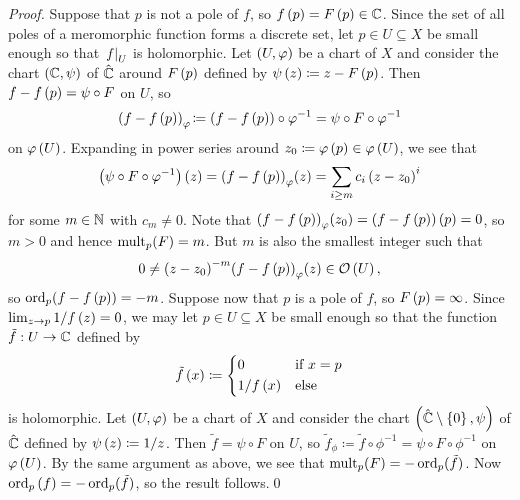 \documentclass[../Moduli_Spaces_of_Riemann_Surfaces.tex]{subfiles}
\begin{document}
    \begin{proof}
        Suppose that $p$ is not a pole of $f$, so $f\left(p\right)=F\left(p\right)\in\mathbb{C}$. Since the set of all poles of a meromorphic function forms a discrete set, let $p\in U\subseteq X$ be small enough so that $\left.f\right|_U$ is holomorphic. Let $\left(U,\varphi\right)$ be a chart of $X$ and consider the chart $\left(\mathbb{C},\psi\right)$ of $\hat{\mathbb{C}}$ around $F\left(p\right)$ defined by $\psi\left(z\right)\coloneqq z-F\left(p\right)$. Then $f-f\left(p\right)=\psi\circ F$ on $U$, so
        \begin{equation*}
            \left(f-f\left(p\right)\right)_\varphi\!\coloneqq\left(f-f\left(p\right)\right)\circ\varphi^{-1}=\psi\circ F\circ\varphi^{-1}
        \end{equation*}
        on $\varphi\left(U\right)$. Expanding in power series around $z_0\coloneqq\varphi\left(p\right)\in\varphi\left(U\right)$, we see that
        \begin{equation*}
            \left(\psi\circ F\circ\varphi^{-1}\right)\left(z\right)=\left(f-f\left(p\right)\right)_\varphi\!\left(z\right)=\sum_{i\geq m}c_i\left(z-z_0\right)^i
        \end{equation*}
        for some $m\in\mathbb{N}$ with $c_m\neq0$. Note that $\left(f-f\left(p\right)\right)_\varphi\!\left(z_0\right)=\left(f-f\left(p\right)\right)\left(p\right)=0$, so $m>0$ and hence $\operatorname{mult}_p\!\left(F\right)=m$. But $m$ is also the smallest integer such that
        \begin{equation*}
            0\neq\left(z-z_0\right)^{-m}\!\left(f-f\left(p\right)\right)_\varphi\!\left(z\right)\in\mathcal{O}\left(U\right),
        \end{equation*}
        so $\operatorname{ord}_p\!\left(f-f\left(p\right)\right)=-m$. Suppose now that $p$ is a pole of $f$, so $F\left(p\right)=\infty$. Since $\lim_{z\to p}1/f\left(z\right)=0$, we may let $p\in U\subseteq X$ be small enough so that the function $\tilde{f}:U\to\mathbb{C}$ defined by
        \begin{equation*}
            \tilde{f}\left(x\right)\coloneqq
            \begin{dcases}
                0 & \textrm{if }x=p \\
                1/f\left(x\right) & \textrm{else}
            \end{dcases}
        \end{equation*}
        is holomorphic. Let $\left(U,\varphi\right)$ be a chart of $X$ and consider the chart $\left(\hat{\mathbb{C}}\setminus\left\{0\right\},\psi\right)$ of $\hat{\mathbb{C}}$ defined by $\psi\left(z\right)\coloneqq1/z$. Then $\tilde{f}=\psi\circ F$ on $U$, so $\tilde{f}_\phi\!\coloneqq\tilde{f}\circ\phi^{-1}=\psi\circ F\circ\phi^{-1}$ on $\varphi\left(U\right)$. By the same argument as above, we see that $\operatorname{mult}_p\!\left(F\right)=-\operatorname{ord}_p(\tilde{f})$. Now $\operatorname{ord}_p\left(f\right)=-\operatorname{ord}_p(\tilde{f})$, so the result follows.\qed
    \end{proof}
\end{document}

